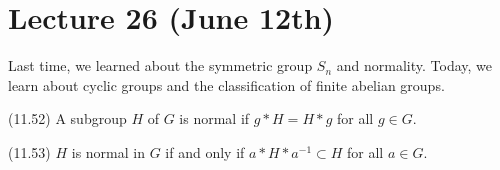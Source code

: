 \section{Lecture 26 (June 12th)}
Last time, we learned about the symmetric group $S_{n}$ and normality. Today, we learn about cyclic groups and the classification of finite abelian groups.
\newline
\begin{defi}
(11.52) A subgroup $H$ of $G$ is normal if $g*H=H*g$ for all $g\in G$. 
\end{defi}
\vspace{2ex}
\begin{rmk}
(11.53) $H$ is normal in $G$ if and only if $a*H*a^{-1}\subset H$ for all $a\in G$.  
\end{rmk}
\vspace{2ex}

